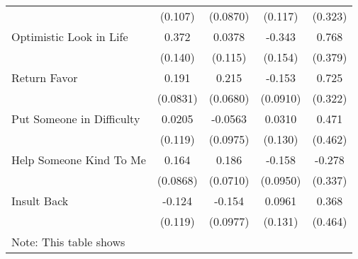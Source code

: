 {\begin{tabular}{l*{4}{c}}
            &     (0.107)         &    (0.0870)         &     (0.117)         &     (0.323)         \\
[1em]
Optimistic Look in Life&       0.372\sym{**} &      0.0378         &      -0.343\sym{*}  &       0.768\sym{*}  \\
            &     (0.140)         &     (0.115)         &     (0.154)         &     (0.379)         \\
[1em]
Return Favor&       0.191\sym{*}  &       0.215\sym{**} &      -0.153         &       0.725\sym{*}  \\
            &    (0.0831)         &    (0.0680)         &    (0.0910)         &     (0.322)         \\
[1em]
Put Someone in Difficulty&      0.0205         &     -0.0563         &      0.0310         &       0.471         \\
            &     (0.119)         &    (0.0975)         &     (0.130)         &     (0.462)         \\
[1em]
Help Someone Kind To Me&       0.164         &       0.186\sym{**} &      -0.158         &      -0.278         \\
            &    (0.0868)         &    (0.0710)         &    (0.0950)         &     (0.337)         \\
[1em]
Insult Back &      -0.124         &      -0.154         &      0.0961         &       0.368         \\
            &     (0.119)         &    (0.0977)         &     (0.131)         &     (0.464)         \\
\hline\hline
\multicolumn{5}{l}{\footnotesize Note: This table shows}\\
\end{tabular}
}

